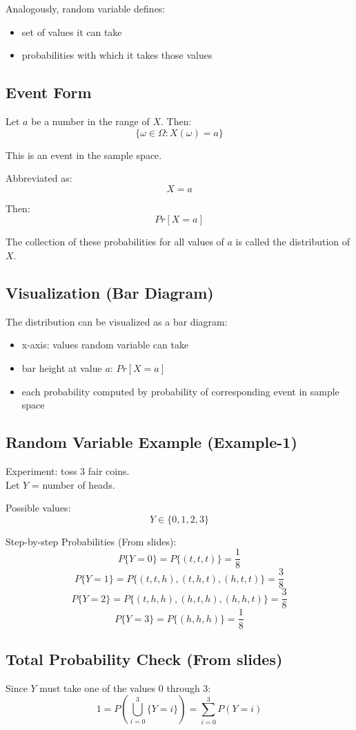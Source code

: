 \documentclass{article}
\begin{document}
Analogously, random variable defines:
\begin{itemize}
\item set of values it can take
\item probabilities with which it takes those values
\end{itemize}

\subsection{Event Form}
Let $a$ be a number in the range of $X$. Then:
\[
\{\omega\in\Omega:X(\omega)=a\}
\]

This is an event in the sample space.

Abbreviated as:
\[
X=a
\]

Then:
\[
Pr[X=a]
\]

The collection of these probabilities for all values of $a$ is called the distribution of $X$.

\subsection{Visualization (Bar Diagram)}
The distribution can be visualized as a bar diagram:
\begin{itemize}
\item x-axis: values random variable can take
\item bar height at value $a$: $Pr[X=a]$
\item each probability computed by probability of corresponding event in sample space
\end{itemize}

\subsection{Random Variable Example (Example-1)}

Experiment: toss 3 fair coins.\\
Let $Y$ = number of heads.

Possible values:
\[
Y\in\{0,1,2,3\}
\]

Step-by-step Probabilities (From slides):
\[
P\{Y=0\}=P\{(t,t,t)\}=\frac{1}{8}
\]
\[
P\{Y=1\}=P\{(t,t,h),(t,h,t),(h,t,t)\}=\frac{3}{8}
\]
\[
P\{Y=2\}=P\{(t,h,h),(h,t,h),(h,h,t)\}=\frac{3}{8}
\]
\[
P\{Y=3\}=P\{(h,h,h)\}=\frac{1}{8}
\]

\subsection{Total Probability Check (From slides)}
Since $Y$ must take one of the values 0 through 3:
\[
1=P\left(\bigcup_{i=0}^{3}\{Y=i\}\right)
=\sum_{i=0}^{3}P(Y=i)
\]
\end{document}
